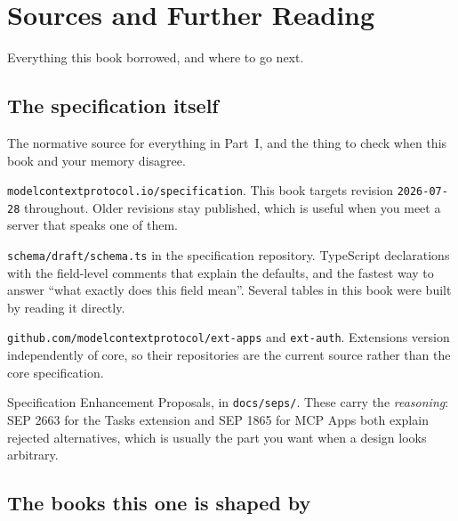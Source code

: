 \chapter{Sources and Further Reading}
\label{app:sources}

Everything this book borrowed, and where to go next.

\section{The specification itself}

The normative source for everything in Part~I, and the thing to check when this
book and your memory disagree.

\begin{description}[leftmargin=1.4em, style=nextline, itemsep=4pt]
\item[The MCP specification] \texttt{modelcontextprotocol.io/specification}.
This book targets revision \texttt{2026-07-28} throughout. Older revisions stay
published, which is useful when you meet a server that speaks one of them.
\item[The schema] \texttt{schema/draft/schema.ts} in the specification
repository. TypeScript declarations with the field-level comments that explain
the defaults, and the fastest way to answer ``what exactly does this field
mean''. Several tables in this book were built by reading it directly.
\item[Extensions] \texttt{github.com/modelcontextprotocol/ext-apps} and
\texttt{ext-auth}. Extensions version independently of core, so their
repositories are the current source rather than the core specification.
\item[The SEP archive] Specification Enhancement Proposals, in
\texttt{docs/seps/}. These carry the \emph{reasoning}: SEP 2663 for the Tasks
extension and SEP 1865 for MCP Apps both explain rejected alternatives, which is
usually the part you want when a design looks arbitrary.
\end{description}

\section{The books this one is shaped by}

